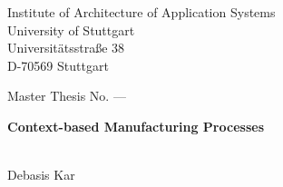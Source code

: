 \documentclass[paper=a4,       %
			 11pt,
			 BCOR0mm,  %
			 DIV10,    %
			 automark, %
			 twoside,
			 halfparskip,
			 bibtotoc,
			 headsepline,
			 normalheadings,
			 appendixprefix,
			 pagesize  %
 ]{scrbook}
\begin{document}
\pagestyle{plain}
\begin{titlepage}
\begin{sffamily}
\begin{center}
Institute of Architecture of Application Systems\\
University of Stuttgart\\
Universitätsstraße 38\\
D-70569 Stuttgart\\
\end{center}

\vspace{3.0cm}

\begin{center}
{Master Thesis No. ---}\\
\vspace{0.5cm}
\begin{minipage}{8.5cm}
\begin{center}
 
  \Large \textbf{Context-based Manufacturing Processes}
 
\end{center}
\end{minipage}
\\
\vspace{1cm}
{Debasis Kar}
\end{center}

\vspace{1.0cm}


\end{sffamily}
\end{titlepage}
\end{document}
